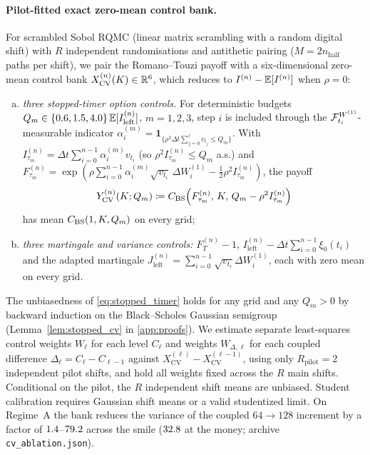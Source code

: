 \paragraph{Pilot-fitted exact zero-mean control bank.}
For scrambled Sobol RQMC \citep{Owen1995} (linear matrix scrambling with a random digital shift) with $R$ independent randomisations and antithetic pairing ($M=2n_{\mathrm{half}}$ paths per shift), we pair the Romano--Touzi payoff with a six-dimensional zero-mean control bank $X_{\mathrm{CV}}^{(n)}(K)\in\mathbb{R}^6$, which reduces to $I^{(n)}-\mathbb{E}[I^{(n)}]$ when $\rho=0$:
\begin{enumerate}[(a)]
  \item \emph{three stopped-timer option controls.} For deterministic budgets $Q_m\in\{0.6,1.5,4.0\}\,\mathbb{E}[I_{\mathrm{left}}^{(n)}]$, $m=1,2,3$, step $i$ is included through the $\mathcal{F}_{t_i}^{W^{(1)}}$-measurable indicator $\alpha_i^{(m)} = \mathbf{1}_{\{\rho^2\Delta t\sum_{j=0}^{i} v_{t_j} \le Q_m\}}$. With $I_{\tau_m}^{(n)}=\Delta t\sum_{i=0}^{n-1}\alpha_i^{(m)} v_{t_i}$ (so $\rho^2 I_{\tau_m}^{(n)}\le Q_m$ a.s.) and $F_{\tau_m}^{(n)}=\exp(\rho\sum_{i=0}^{n-1}\alpha_i^{(m)}\sqrt{v_{t_i}}\,\Delta W_i^{(1)}\allowbreak-\tfrac12\rho^2 I_{\tau_m}^{(n)})$, the payoff
  \begin{equation}
    Y_{\mathrm{CV}}^{(n)}(K;Q_m) \coloneqq C_{\mathrm{BS}}\!\left(F_{\tau_m}^{(n)},\,K,\,Q_m-\rho^2 I_{\tau_m}^{(n)}\right)
    \label{eq:stopped_timer}
  \end{equation}
  has mean $C_{\mathrm{BS}}(1,K,Q_m)$ on every grid;
  \item \emph{three martingale and variance controls:} $F_T^{(n)} - 1$, $I_{\mathrm{left}}^{(n)}-\Delta t\sum_{i=0}^{n-1}\xi_0(t_i)$ and the adapted martingale $J_{\mathrm{left}}^{(n)}=\sum_{i=0}^{n-1}\sqrt{v_{t_i}}\Delta W_i^{(1)}$, each with zero mean on every grid.
\end{enumerate}
The unbiasedness of \eqref{eq:stopped_timer} holds for any grid and any $Q_m>0$ by backward induction on the Black--Scholes Gaussian semigroup (Lemma~\ref{lem:stopped_cv} in \ref{app:proofs}). We estimate separate least-squares control weights $W_\ell$ for each level $C_\ell$ and weights $W_{\Delta,\ell}$ for each coupled difference $\Delta_\ell=C_\ell-C_{\ell-1}$ against $X_{\mathrm{CV}}^{(\ell)}-X_{\mathrm{CV}}^{(\ell-1)}$, using only $R_{\mathrm{pilot}}=2$ independent pilot shifts, and hold all weights fixed across the $R$ main shifts. Conditional on the pilot, the $R$ independent shift means are unbiased. Student calibration requires Gaussian shift means or a valid studentized limit. On Regime~A the bank reduces the variance of the coupled $64\to128$ increment by a factor of $1.4$--$79.2$ across the smile ($32.8$ at the money; archive \texttt{cv\_ablation.json}).

